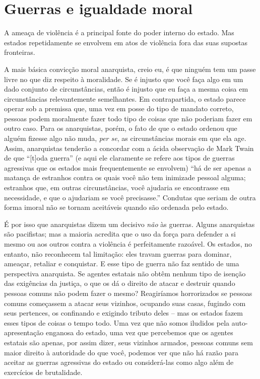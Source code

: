 \section{Guerras e igualdade moral}

A ameaça de violência é a principal fonte do poder interno do estado. Mas estados repetidamente se envolvem em atos de violência fora das suas supostas fronteiras.

A mais básica convicção moral anarquista, creio eu, é que ninguém tem um passe livre no que diz respeito à moralidade. Se é injusto que você faça algo em um dado conjunto de circunstâncias, então é injusto que eu faça a mesma coisa em circunstâncias relevantemente semelhantes. Em contrapartida, o estado parece operar sob a premissa que, uma vez em posse do tipo de mandato correto, pessoas podem moralmente fazer todo tipo de coisas que não poderiam fazer em outro caso. Para os anarquistas, porém, o fato de que o estado ordenou que alguém fizesse algo não muda, \emph{per se}, as circunstâncias morais em que ela age. Assim, anarquistas tenderão a concordar com a ácida observação de Mark Twain de que ``[t]oda guerra'' (e aqui ele claramente se refere aos tipos de guerras agressivas que os estados mais frequentemente se envolvem) ``há de ser apenas a matança de estranhos contra os quais você não tem inimizade pessoal alguma; estranhos que, em outras circunstâncias, você ajudaria se encontrasse em necessidade, e que o ajudariam se você precisasse.'' Condutas que seriam de outra forma imoral não se tornam aceitáveis quando são ordenada pelo estado.

É por isso que anarquistas dizem um decisivo \emph{não} às guerras. Alguns anarquistas são pacifistas; mas a maioria acredita que o uso da força para defender a si mesmo ou aos outros contra a violência é perfeitamente razoável. Os estados, no entanto, não reconhecem tal limitação: eles travam guerras para dominar, ameaçar, retaliar e conquistar. E esse tipo de guerra não faz sentido de uma perspectiva anarquista. Se agentes estatais não obtêm nenhum tipo de isenção das exigências da justiça, o que os dá o direito de atacar e destruir quando pessoas comuns não podem fazer o mesmo? Reagiríamos horrorizados se pessoas comuns começassem a atacar seus vizinhos, ocupando suas casas, fugindo com seus pertences, os confinando e exigindo tributo deles -- mas os estados fazem esses tipos de coisas o tempo todo. Uma vez que não somos iludidos pela auto-apresentação enganosa do estado, uma vez que percebemos que os agentes estatais são apenas, por assim dizer, seus vizinhos armados, pessoas comuns sem maior direito à autoridade do que você, podemos ver que não há razão para aceitar as guerras agressivas do estado ou considerá-las como algo além de exercícios de brutalidade.

